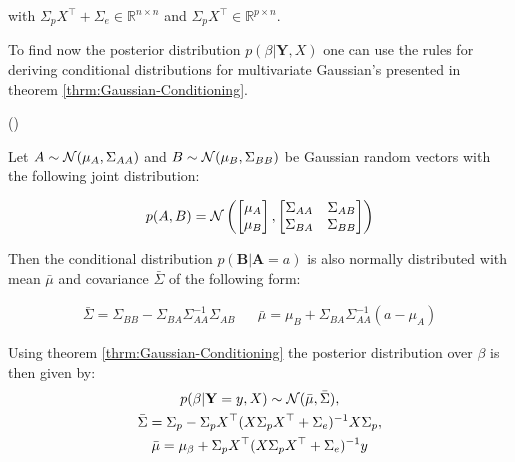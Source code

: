 with $\Sigma_p X^{\top} + \Sigma_e \in \mathbb{R}^{n\times n}$ and $\Sigma_p X^{\top} \in \mathbb{R}^{p\times n}$.

To find now the posterior distribution $p(\beta | \mathbf{Y}, X)$ one can use the rules for deriving conditional
distributions for multivariate Gaussian's presented in theorem \ref{thrm:Gaussian-Conditioning}.

\begin{theorem}\label{thrm:Gaussian-Conditioning} (\citeauthor{von_mises_mathematical_1964})

Let $A \sim \operatorname{\mathcal{N}}(\mu_A, \Sigma_{AA})$ and $B \sim \operatorname{\mathcal{N}}(\mu_B, \Sigma_{BB})$ be
Gaussian random vectors with the following joint distribution:

\begin{gather*}
    p(A, B) = \operatorname{\mathcal{N}} \left(
    \begin{bmatrix}
        \mu_A \\
        \mu_B
    \end{bmatrix},
    \begin{bmatrix}
        \Sigma_{AA} & \Sigma_{AB} \\
        \Sigma_{BA} & \Sigma_{BB}
    \end{bmatrix}
    \right)
\end{gather*}

Then the conditional distribution $p(\mathbf{B} | \mathbf{A}=a)$ is also normally distributed
with mean $\bar{\mu}$ and covariance $\bar{\Sigma}$ of the following form:

\begin{align*}
    \bar{\Sigma} = \Sigma_{B B} - \Sigma_{B A} \Sigma_{A A}^{-1} \Sigma_{A B} & & \bar{\mu} = \mu_{B} + \Sigma_{BA} \Sigma_{AA}^{-1}(a - \mu_A)
\end{align*}


\end{theorem}



Using theorem \ref{thrm:Gaussian-Conditioning} the posterior distribution over $\beta$ is then given by:
\begin{gather*}
    p(\beta | \mathbf{Y}=y, X) \sim \operatorname{\mathcal{N}}(\bar{\mu}, \bar{\Sigma}), \\
    \bar{\Sigma} = \Sigma_{p} - \Sigma_p X^{\top}(X \Sigma_p X^{\top} + \Sigma_e)^{-1} X  \Sigma_p, \\
    \bar{\mu} = \mu_{\beta} + \Sigma_p X^{\top}(X \Sigma_p X^{\top} + \Sigma_e)^{-1}y
\end{gather*}

